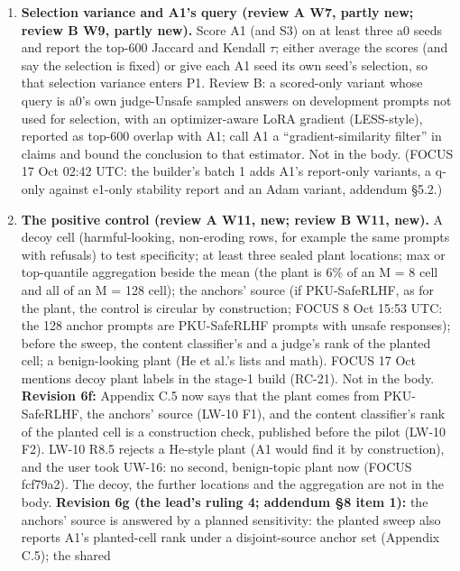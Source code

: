 \documentclass{article}
\theoremstyle{plain}
\theoremstyle{definition}
\theoremstyle{remark}
\begin{document}
\begin{enumerate}
        the cite of Eiras et al.
  \item \textbf{Selection variance and A1's query (review A W7, partly new;
        review B W9, partly new).} Score A1 (and S3) on at least three a0 seeds
        and report the top-600 Jaccard and Kendall $\tau$; either average the
        scores (and say the selection is fixed) or give each A1 seed its own
        seed's selection, so that selection variance enters P1. Review B: a
        scored-only variant whose query is a0's own judge-Unsafe sampled answers
        on development prompts not used for selection, with an optimizer-aware
        LoRA gradient (LESS-style), reported as top-600 overlap with A1; call A1
        a ``gradient-similarity filter'' in claims and bound the conclusion to
        that estimator. Not in the body. (FOCUS 17 Oct 02:42 UTC: the builder's
        batch 1 adds A1's report-only variants, a q-only against e1-only
        stability report and an Adam variant, addendum \S{}5.2.)
  \item \textbf{The positive control (review A W11, new; review B W11, new).} A
        decoy cell (harmful-looking, non-eroding rows, for example the same
        prompts with refusals) to test specificity; at least three sealed plant
        locations; max or top-quantile aggregation beside the mean (the plant is
        6\% of an M = 8 cell and all of an M = 128 cell); the anchors' source
        (if PKU-SafeRLHF, as for the plant, the control is circular by
        construction; FOCUS 8 Oct 15:53 UTC: the 128 anchor prompts are
        PKU-SafeRLHF prompts with unsafe responses); before the sweep, the
        content classifier's and a judge's rank of the planted cell; a
        benign-looking plant (He et al.'s lists and math). FOCUS 17 Oct mentions
        decoy plant labels in the stage-1 build (RC-21). Not in the body.
        \textbf{Revision 6f:} Appendix C.5 now says that the plant comes from
        PKU-SafeRLHF, the anchors' source (LW-10 F1), and the content
        classifier's rank of the planted cell is a construction check, published
        before the pilot (LW-10 F2). LW-10 R8.5 rejects a He-style plant (A1
        would find it by construction), and the user took UW-16: no second,
        benign-topic plant now (FOCUS fcf79a2). The decoy, the further locations
        and the aggregation are not in the body. \textbf{Revision 6g (the lead's
        ruling 4; addendum \S{}8 item 1):} the anchors' source is answered by a
        planned sensitivity: the planted sweep also reports A1's planted-cell
        rank under a disjoint-source anchor set (Appendix C.5); the shared

\end{enumerate}
\end{document}
